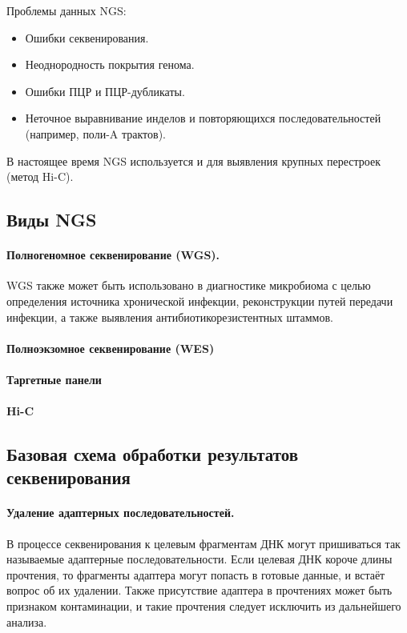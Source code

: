 \documentclass[a4paper,12pt]{article}
\begin{document}
Проблемы данных NGS:

\begin{itemize}
\item Ошибки секвенирования.
\item Неоднородность покрытия генома.
\item Ошибки ПЦР и ПЦР-дубликаты.
\item Неточное выравнивание инделов и повторяющихся последовательностей (например, поли-A трактов).
\end{itemize}

В настоящее время NGS используется и для выявления крупных перестроек (метод Hi-C).

\subsection{Виды NGS}

\paragraph{Полногеномное секвенирование (WGS).}

WGS также может быть использовано в диагностике микробиома с целью определения источника хронической инфекции, реконструкции путей передачи инфекции, а также выявления антибиотикорезистентных штаммов\cite{balloux}.

\paragraph{Полноэкзомное секвенирование (WES)}

\paragraph{Таргетные панели}

\paragraph{Hi-C}

\subsection{Базовая схема обработки результатов секвенирования}

\paragraph{Удаление адаптерных последовательностей.}
В процессе секвенирования к целевым фрагментам ДНК могут пришиваться так называемые адаптерные последовательности.
Если целевая ДНК короче длины прочтения, то фрагменты адаптера могут попасть в готовые данные, и встаёт вопрос об их удалении.
Также присутствие адаптера в прочтениях может быть признаком контаминации, и такие прочтения следует исключить из дальнейшего анализа\cite{cutadapt}.
\end{document}
